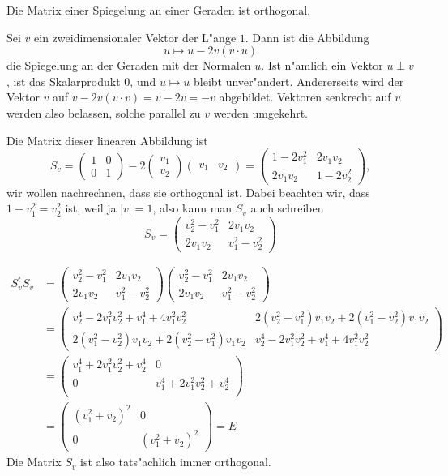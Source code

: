 \begin{beispiel}
Die Matrix einer Spiegelung an einer Geraden ist orthogonal.

\smallskip

{\parindent 0pt
Sei} $v$ ein zweidimensionaler Vektor der L"ange $1$. Dann ist
die Abbildung 
\[
u\mapsto u-2v(v\cdot u)
\]
die Spiegelung an der Geraden mit der Normalen $u$. Ist n"amlich
ein Vektor $u\perp v$, ist das Skalarprodukt $0$, und $u\mapsto u$
bleibt unver"andert. Andererseits wird der Vektor $v$ auf
$v-2v(v\cdot v)=v-2v=-v$ abgebildet. Vektoren senkrecht auf $v$
werden also belassen, solche parallel zu $v$ werden umgekehrt.

Die Matrix dieser linearen Abbildung ist
\[
S_v=\begin{pmatrix}1&0\\0&1\end{pmatrix}
-
2\begin{pmatrix}v_1\\v_2\end{pmatrix}
\begin{pmatrix}v_1&v_2\end{pmatrix}
=
\begin{pmatrix}
1-2v_1^2&2v_1v_2\\
2v_1v_2&1-2v_2^2
\end{pmatrix},
\]
wir wollen nachrechnen, dass sie orthogonal ist. Dabei beachten
wir, dass $1-v_1^2=v_2^2$ ist, weil ja $|v|=1$, also kann man $S_v$
auch schreiben
\[
S_v=\begin{pmatrix}
v_2^2-v_1^2&2v_1v_2\\
2v_1v_2&v_1^2-v_2^2
\end{pmatrix}
\]

\begin{align*}
S_v^tS_v
&=
\begin{pmatrix}
v_2^2-v_1^2&2v_1v_2\\
2v_1v_2&v_1^2-v_2^2
\end{pmatrix}
\begin{pmatrix}
v_2^2-v_1^2&2v_1v_2\\
2v_1v_2&v_1^2-v_2^2
\end{pmatrix}
\\
&=
\begin{pmatrix}
v_2^4-2v_1^2v_2^2+v_1^4+4v_1^2v_2^2&
2(v_2^2-v_1^2)v_1v_2
+
2(v_1^2-v_2^2)v_1v_2
\\
2(v_1^2-v_2^2)v_1v_2
+
2(v_2^2-v_1^2)v_1v_2
&
v_2^4-2v_1^2v_2^2+v_1^4+4v_1^2v_2^2
\end{pmatrix}
\\
&=
\begin{pmatrix}
v_1^4+2v_1^2v_2^2+v_2^4&0\\
0&v_1^4+2v_1^2v_2^2+v_2^4\\
\end{pmatrix}
\\
&=
\begin{pmatrix}
(v_1^2+v_2)^2&0\\
0&(v_1^2+v_2)^2
\end{pmatrix}=E
\end{align*}
Die Matrix $S_v$ ist also tats"achlich immer orthogonal.


\end{beispiel}
